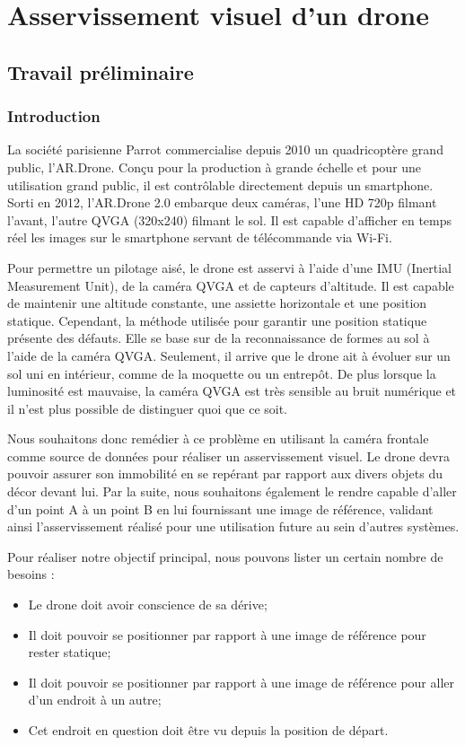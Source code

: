 \documentclass[10pt,a4paper]{report}
\author{Antoine MEUNIER, Anis SEMMAR}
\begin{document}
\part*{Asservissement visuel d'un drone}

\chapter {Travail préliminaire}
	
\section{Introduction}


 		La société parisienne Parrot commercialise depuis 2010 un quadricoptère grand public, l'AR.Drone. Conçu pour la production à grande échelle et pour une utilisation grand public, il est contrôlable directement depuis un smartphone. Sorti en 2012, l'AR.Drone 2.0 embarque deux caméras, l'une HD 720p filmant l'avant, l'autre QVGA (320x240) filmant le sol. Il est capable d'afficher en temps réel les images sur le smartphone servant de télécommande via Wi-Fi. 


		Pour permettre un pilotage aisé, le drone est asservi à l'aide d'une IMU (Inertial Measurement Unit), de la caméra QVGA et de capteurs d'altitude. Il est capable de maintenir une altitude constante, une assiette horizontale et une position statique. Cependant, la méthode utilisée pour garantir une position statique présente des défauts. Elle se base sur de la reconnaissance de formes au sol à l'aide de la caméra QVGA. Seulement, il arrive que le drone ait à évoluer sur un sol uni en intérieur, comme de la moquette ou un entrepôt. De plus lorsque la luminosité est mauvaise, la caméra QVGA est très sensible au bruit numérique et il n'est plus possible de distinguer quoi que ce soit.
		

		Nous souhaitons donc remédier à ce problème en utilisant la caméra frontale comme source de données pour réaliser un asservissement visuel. Le drone devra pouvoir assurer son immobilité en se repérant par rapport aux divers objets du décor devant lui. Par la suite, nous souhaitons également le rendre capable d'aller d'un point A à un point B en lui fournissant une image de référence, validant ainsi l'asservissement réalisé pour une utilisation future au sein d'autres systèmes.
		

				
		Pour réaliser notre objectif principal, nous pouvons lister un certain nombre de besoins :
		\begin{itemize}
		\item Le drone doit avoir conscience de sa dérive;
		\item Il doit pouvoir se positionner par rapport à une image de référence 			pour rester statique;
		\item Il doit pouvoir se positionner par rapport à une image de référence 
			pour aller d'un endroit à un autre;
		\item Cet endroit en question doit être vu depuis la position de départ.
		\end{itemize}
						
\end{document}
